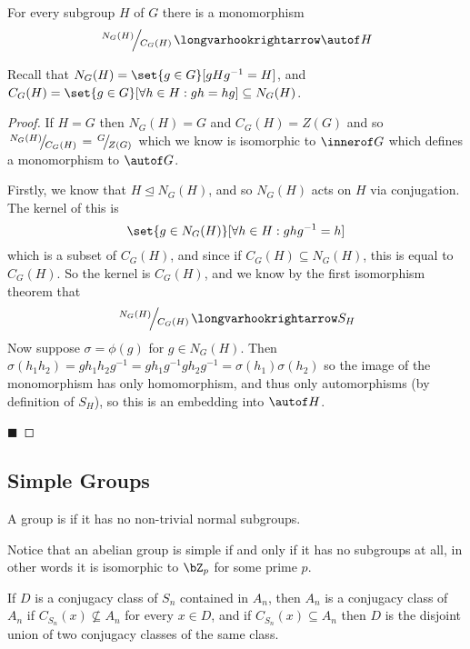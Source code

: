 \documentclass[10pt]{article}
\def\slfrac#1#2{\left.{}^{#1}\mkern-4mu\middle/\mkern-3mu{}_{#2}\right.}
\let\normalsub=\trianglelefteq
\let\mmorph=\longvarhookrightarrow
\begin{document}
\begin{thrm*}

    For every subgroup $H$ of $G$ there is a monomorphism
    \[ \slfrac{N_G(H)}{C_G(H)}\mmorph\autof H \]

\end{thrm*}

Recall that $N_G(H)=\set{g\in G}[gHg^{-1}=H]$, and $C_G(H)=\set{g\in G}[\forall h\in H: gh=hg]\subseteq N_G(H)$.

\begin{proof}

    If $H=G$ then $N_G(H)=G$ and $C_G(H)=Z(G)$ and so $\slfrac{N_G(H)}{C_G(H)}=\slfrac{G}{Z(G)}$ which we know is isomorphic to $\innerof G$ which defines a monomorphism to $\autof G$.

    Firstly, we know that $H\normalsub N_G(H)$, and so $N_G(H)$ acts on $H$ via conjugation.
    The kernel of this is
    \[ \set{g\in N_G(H)}[\forall h\in H: ghg^{-1}=h] \]
    which is a subset of $C_G(H)$, and since if $C_G(H)\subseteq N_G(H)$, this is equal to $C_G(H)$.
    So the kernel is $C_G(H)$, and we know by the first isomorphism theorem that
    \[ \slfrac{N_G(H)}{C_G(H)} \mmorph S_H \]
    Now suppose $\sigma=\phi(g)$ for $g\in N_G(H)$.
    Then $\sigma(h_1h_2)=gh_1h_2g^{-1}=gh_1g^{-1}gh_2g^{-1}=\sigma(h_1)\sigma(h_2)$ so the image of the monomorphism has only homomorphism, and thus only automorphisms (by definition of $S_H$), so this is
    an embedding into $\autof H$.

    \hfill$\blacksquare$

\end{proof}

\subsection{Simple Groups}

\begin{defn*}

    A group is  if it has no non-trivial normal subgroups.

\end{defn*}

Notice that an abelian group is simple if and only if it has no subgroups at all, in other words it is isomorphic to $\bZ_p$ for some prime $p$.

\begin{lemm*}

    If $D$ is a conjugacy class of $S_n$ contained in $A_n$, then $A_n$ is a conjugacy class of $A_n$ if $C_{S_n}(x)\not\subseteq A_n$ for every $x\in D$, and if $C_{S_n}(x)\subseteq A_n$ then $D$ is the
    disjoint union of two conjugacy classes of the same class.

\end{lemm*}
\end{document}
